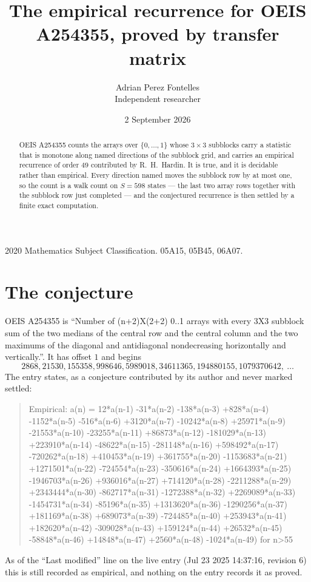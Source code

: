 \documentclass[11pt,a4paper]{article}
\title{The empirical recurrence for OEIS A254355, proved by transfer matrix}
\author{Adrian Perez Fontelles\\ \small Independent researcher}
\date{2 September 2026}
\theoremstyle{plain}
\theoremstyle{definition}
\begin{document}
\maketitle

\begin{abstract}
OEIS A254355 counts the arrays over $\{0,\dots,1\}$ whose $3\times3$ subblocks carry a
statistic that is monotone along named directions of the subblock grid, and carries an
empirical recurrence of order $49$ contributed by R.~H.~Hardin. It is true, and it is
decidable rather than empirical. Every direction named moves the subblock row by at most one,
so the count is a walk count on $S=598$ states --- the last two array rows together with the
subblock row just completed --- and the conjectured recurrence is then settled by a finite
exact computation.
\end{abstract}

\noindent\small 2020 Mathematics Subject Classification. 05A15, 05B45, 06A07.\normalsize

\section{The conjecture}

OEIS A254355 is ``Number of (n+2)X(2+2) 0..1 arrays with every 3X3 subblock sum of the two medians of the central row and the central column and the two maximums of the diagonal and antidiagonal nondecreasing horizontally and vertically.''. It has offset $1$ and begins
\[
2868, 21530, 155358, 998646, 5989018, 34611365, 194880155, 1079370642,\ \dots
\]
The entry states, as a conjecture contributed by its author and never marked settled:
\begin{quote}
Empirical: a(n) = 12*a(n-1) -31*a(n-2) -138*a(n-3) +828*a(n-4) -1152*a(n-5) -516*a(n-6) +3120*a(n-7) -10242*a(n-8) +25971*a(n-9) -21553*a(n-10) -23255*a(n-11) +86873*a(n-12) -181029*a(n-13) +223910*a(n-14) -48622*a(n-15) -281148*a(n-16) +598492*a(n-17) -720262*a(n-18) +410453*a(n-19) +361755*a(n-20) -1153683*a(n-21) +1271501*a(n-22) -724554*a(n-23) -350616*a(n-24) +1664393*a(n-25) -1946703*a(n-26) +936016*a(n-27) +714120*a(n-28) -2211288*a(n-29) +2343444*a(n-30) -862717*a(n-31) -1272388*a(n-32) +2269089*a(n-33) -1454731*a(n-34) -85196*a(n-35) +1313620*a(n-36) -1290256*a(n-37) +181169*a(n-38) +689073*a(n-39) -724485*a(n-40) +253943*a(n-41) +182620*a(n-42) -309028*a(n-43) +159124*a(n-44) +26532*a(n-45) -58848*a(n-46) +14848*a(n-47) +2560*a(n-48) -1024*a(n-49) for n>55
\end{quote}
As of the ``Last modified'' line on the live entry (Jul 23 2025 14:37:16, revision 6) this is still
recorded as empirical, and nothing on the entry records it as proved.
\end{document}
